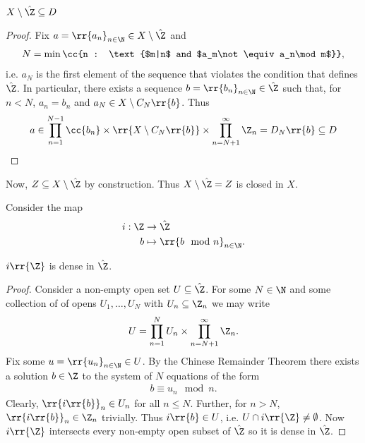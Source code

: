 \documentclass{article}
\begin{document}
\begin{claim*}
  $X\setminus\hat\Z\subseteq D$
  \begin{proof}
    Fix $a=\rr{a_n}_{n\in\N}\in X\setminus\hat\Z$ and
    \begin{align*}
      N=\min\cc{n : \text{$m|n$ and $a_m\not\equiv a_n\mod m$}},
    \end{align*}
    i.e. $a_N$ is the first element of the sequence that violates the condition that defines $\hat\Z$.
    In particular, there exists a sequence $b=\rr{b_n}_{n\in\N}\in\hat\Z$ such that,
    for $n<N$, $a_n=b_n$ and $a_N\in X\setminus C_N\rr{b}$. Thus
    \begin{align*}
      a\in \prod_{n=1}^{N-1} \cc{b_n} \times \rr{X\setminus C_N\rr{b}} \times \prod_{n=N+1}^\infty \Z_n= D_N\rr{b}\subseteq D
    \end{align*}
  \end{proof}
\end{claim*}

Now, $Z\subseteq X\setminus\hat\Z$ by construction. Thus $X\setminus\hat\Z=Z$ is closed
in $X$.

Consider the map
\begin{align*}
  i:\Z&\to\hat\Z \\
  b&\mapsto  \rr{b \mod n}_{n\in\N}.
\end{align*}

\begin{claim*}
  $i\rr{\Z}$ is dense in $\hat\Z$.
  \begin{proof}
    Consider a non-empty open set $U\subseteq\hat\Z$. For some $N\in\N$ and some collection of
    of opens $U_1,\ldots,U_N$ with $U_n\subseteq \Z_n$ we may write
    \begin{align*}
      U = \prod_{n=1}^{N}U_n \times \prod_{n=N+1}^\infty \Z_n.
    \end{align*}
    Fix some $u=\rr{u_n}_{n\in\N}\in U$. By the Chinese Remainder Theorem there exists a
    solution $b\in\Z$ to the system of $N$ equations of the form
    \begin{align*}
      b \equiv u_n \mod n.
    \end{align*}
    Clearly, $\rr{i\rr{b}}_{n}\in U_n$ for all $n\leq N$. Further, for $n>N$, $\rr{i\rr{b}}_n\in\Z_n$
    trivially. Thus $i\rr{b}\in U$, i.e. $U\cap i\rr{\Z}\neq\emptyset$. Now $i\rr{\Z}$ intersects
    every non-empty open subset of $\hat\Z$ so it is dense in $\hat\Z$.
  \end{proof}
\end{claim*}
\end{document}
